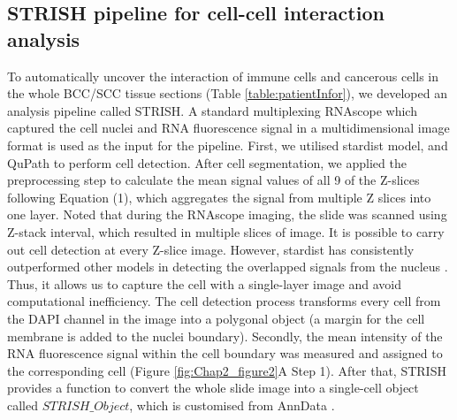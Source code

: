 \subsection{STRISH pipeline for cell-cell interaction analysis}
\label{Sec:2.3_validation} 
To automatically uncover the interaction of immune cells and cancerous cells in the whole BCC/SCC tissue sections (Table \ref{table:patientInfor}), we developed an analysis pipeline called STRISH. A standard multiplexing RNAscope which captured the cell nuclei and RNA fluorescence signal in a multidimensional image format is used as the input for the pipeline. First, we utilised stardist \cite{schmidt2018cell} model, and QuPath \cite{bankhead2017qupath} to perform cell detection. After cell segmentation, we applied the preprocessing step to calculate the mean signal values of all 9 of the Z-slices following Equation (1), which aggregates the signal from multiple Z slices into one layer. Noted that during the RNAscope imaging, the slide was scanned using Z-stack interval, which resulted in multiple slices of image. It is possible to carry out cell detection at every Z-slice image. However, stardist has consistently outperformed other models in detecting the overlapped signals from the nucleus \cite{schmidt2018cell}. Thus, it allows us to capture the cell with a single-layer image and avoid computational inefficiency. The cell detection process transforms every cell from the DAPI channel in the image into a polygonal object (a margin for the cell membrane is added to the nuclei boundary). Secondly, the mean intensity of the RNA fluorescence signal within the cell boundary was measured and assigned to the corresponding cell (Figure \ref{fig:Chap2_figure2}A Step 1). After that, STRISH provides a function to convert the whole slide image into a single-cell object called $STRISH\_Object$, which is customised from AnnData \cite{wolf2018scanpy}. 


